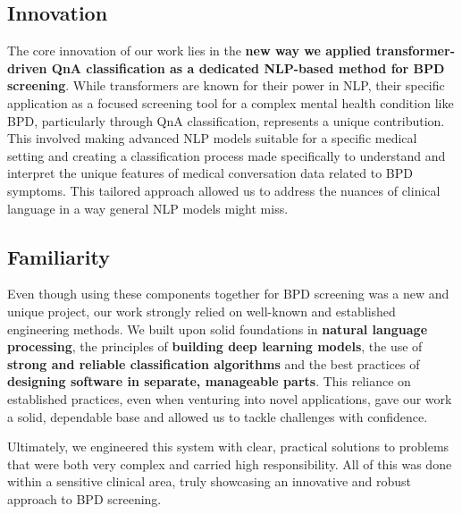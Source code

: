 \subsection{Innovation}
The core innovation of our work lies in the \textbf{new way we applied transformer-driven QnA classification as a dedicated NLP-based method for BPD screening}. While transformers are known for their power in NLP, their specific application as a focused screening tool for a complex mental health condition like BPD, particularly through QnA classification, represents a unique contribution. This involved making advanced NLP models suitable for a specific medical setting and creating a classification process made specifically to understand and interpret the unique features of medical conversation data related to BPD symptoms. This tailored approach allowed us to address the nuances of clinical language in a way general NLP models might miss.

\subsection{Familiarity}
Even though using these components together for BPD screening was a new and unique project, our work strongly relied on well-known and established engineering methods. We built upon solid foundations in \textbf{natural language processing}, the principles of \textbf{building deep learning models}, the use of \textbf{strong and reliable classification algorithms} and the best practices of \textbf{designing software in separate, manageable parts}. This reliance on established practices, even when venturing into novel applications, gave our work a solid, dependable base and allowed us to tackle challenges with confidence.

Ultimately, we engineered this system with clear, practical solutions to problems that were both very complex and carried high responsibility. All of this was done within a sensitive clinical area, truly showcasing an innovative and robust approach to BPD screening.

